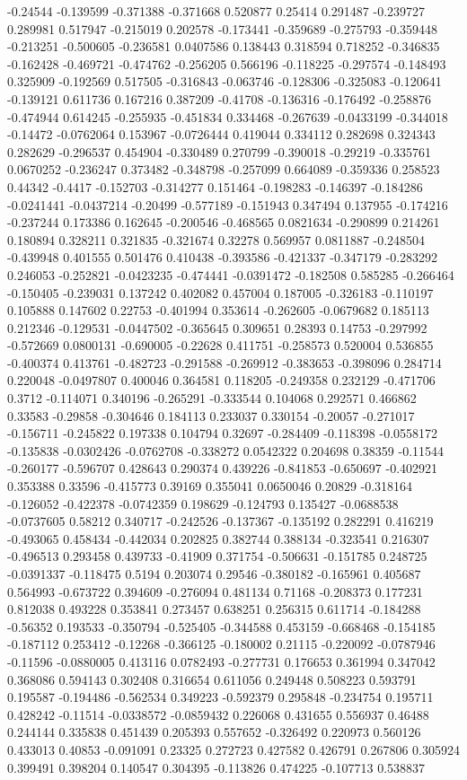 -0.24544 -0.139599 -0.371388 -0.371668 0.520877 0.25414 0.291487 -0.239727 0.289981 0.517947 -0.215019 0.202578 -0.173441 -0.359689 -0.275793 -0.359448 -0.213251 -0.500605 -0.236581 0.0407586 0.138443 0.318594 0.718252 -0.346835 -0.162428 -0.469721 -0.474762 -0.256205 0.566196 -0.118225 -0.297574 -0.148493 0.325909 -0.192569 0.517505 -0.316843 -0.063746 -0.128306 -0.325083 -0.120641 -0.139121 0.611736 0.167216 0.387209 -0.41708 -0.136316 -0.176492 -0.258876 -0.474944 0.614245 -0.255935 -0.451834 0.334468 -0.267639 -0.0433199 -0.344018 -0.14472 -0.0762064 0.153967 -0.0726444 0.419044 0.334112 0.282698 0.324343 0.282629 -0.296537 0.454904 -0.330489 0.270799 -0.390018 -0.29219 -0.335761 0.0670252 -0.236247 0.373482 -0.348798 -0.257099 0.664089 -0.359336 0.258523 0.44342 -0.4417 -0.152703 -0.314277 0.151464 -0.198283 -0.146397 -0.184286 -0.0241441 -0.0437214 -0.20499 -0.577189 -0.151943 0.347494 0.137955 -0.174216 -0.237244 0.173386 0.162645 -0.200546 -0.468565 0.0821634 -0.290899 0.214261 0.180894 0.328211 0.321835 -0.321674 0.32278 0.569957 0.0811887 -0.248504 -0.439948 0.401555 0.501476 0.410438 -0.393586 -0.421337 -0.347179 -0.283292 0.246053 -0.252821 -0.0423235 -0.474441 -0.0391472 -0.182508 0.585285 -0.266464 -0.150405 -0.239031 0.137242 0.402082 0.457004 0.187005 -0.326183 -0.110197 0.105888 0.147602 0.22753 -0.401994 0.353614 -0.262605 -0.0679682 0.185113 0.212346 -0.129531 -0.0447502 -0.365645 0.309651 0.28393 0.14753 -0.297992 -0.572669 0.0800131 -0.690005 -0.22628 0.411751 -0.258573 0.520004 0.536855 -0.400374 0.413761 -0.482723 -0.291588 -0.269912 -0.383653 -0.398096 0.284714 0.220048 -0.0497807 0.400046 0.364581 0.118205 -0.249358 0.232129 -0.471706 0.3712 -0.114071 0.340196 -0.265291 -0.333544 0.104068 0.292571 0.466862 0.33583 -0.29858 -0.304646 0.184113 0.233037 0.330154 -0.20057 -0.271017 -0.156711 -0.245822 0.197338 0.104794 0.32697 -0.284409 -0.118398 -0.0558172 -0.135838 -0.0302426 -0.0762708 -0.338272 0.0542322 0.204698 0.38359 -0.11544 -0.260177 -0.596707 0.428643 0.290374 0.439226 -0.841853 -0.650697 -0.402921 0.353388 0.33596 -0.415773 0.39169 0.355041 0.0650046 0.20829 -0.318164 -0.126052 -0.422378 -0.0742359 0.198629 -0.124793 0.135427 -0.0688538 -0.0737605 0.58212 0.340717 -0.242526 -0.137367 -0.135192 0.282291 0.416219 -0.493065 0.458434 -0.442034 0.202825 0.382744 0.388134 -0.323541 0.216307 -0.496513 0.293458 0.439733 -0.41909 0.371754 -0.506631 -0.151785 0.248725 -0.0391337 -0.118475 0.5194 0.203074 0.29546 -0.380182 -0.165961 0.405687 0.564993 -0.673722 0.394609 -0.276094 0.481134 0.71168 -0.208373 0.177231 0.812038 0.493228 0.353841 0.273457 0.638251 0.256315 0.611714 -0.184288 -0.56352 0.193533 -0.350794 -0.525405 -0.344588 0.453159 -0.668468 -0.154185 -0.187112 0.253412 -0.12268 -0.366125 -0.180002 0.21115 -0.220092 -0.0787946 -0.11596 -0.0880005 0.413116 0.0782493 -0.277731 0.176653 0.361994 0.347042 0.368086 0.594143 0.302408 0.316654 0.611056 0.249448 0.508223 0.593791 0.195587 -0.194486 -0.562534 0.349223 -0.592379 0.295848 -0.234754 0.195711 0.428242 -0.11514 -0.0338572 -0.0859432 0.226068 0.431655 0.556937 0.46488 0.244144 0.335838 0.451439 0.205393 0.557652 -0.326492 0.220973 0.560126 0.433013 0.40853 -0.091091 0.23325 0.272723 0.427582 0.426791 0.267806 0.305924 0.399491 0.398204 0.140547 0.304395 -0.113826 0.474225 -0.107713 0.538837 